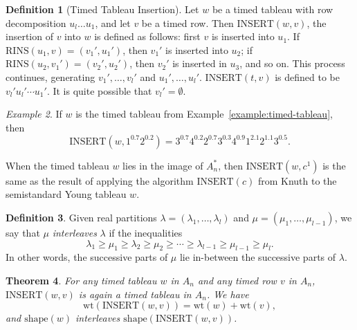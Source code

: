 \documentclass[10pt]{amsproc}
\newtheorem{theorem}{Theorem}[subsection]
\theoremstyle{definition}
\newtheorem{definition}[theorem]{Definition}
\theoremstyle{remark}
\newtheorem{example}[theorem]{Example}
\newcommand{\rowins}{\mathrm{RINS}}
\newcommand{\ins}{\mathrm{INSERT}}
\newcommand{\wt}{\mathrm{wt}}
\newcommand{\shape}{\mathrm{shape}}
\begin{document}
\begin{definition}
  [Timed Tableau Insertion]
  Let $w$ be a timed tableau with row decomposition $u_l\dotsc u_1$, and let $v$ be a timed row.
  Then $\ins(w, v)$, the insertion of $v$ into $w$ is defined as follows:
  first $v$ is inserted into $u_1$.
  If $\rowins(u_1,v)=(v_1',u_1')$, then $v_1'$ is inserted into $u_2$; if $\rowins(u_2,v_1')=(v_2',u_2')$, then $v_2'$ is inserted in $u_3$, and so on.
  This process continues, generating $v_1',\dotsc,v_l'$ and $u_1',\dotsc,u_l'$.
  $\ins(t,v)$ is defined to be $v_l'u_l'\dotsb u_1'$.
  It is quite possible that $v_l'=\emptyset$.
\end{definition}
\begin{example}
  If $w$ is the timed tableau from Example~\ref{example:timed-tableau}, then
  \begin{displaymath}
    \ins(w,1^{0.7}2^{0.2})=3^{0.7}4^{0.2}2^{0.7}3^{0.3}4^{0.9}1^{2.1}2^{1.1}3^{0.5}.
  \end{displaymath}
\end{example}
When the timed tableau $w$ lies in the image of $A_n^*$, then $\ins(w,c^1)$ is the same as the result of applying the algorithm $\text{INSERT}(c)$ from Knuth \cite{knuth} to the semistandard Young tableau $w$.
\begin{definition}
  Given real partitions $\lambda=(\lambda_1,\dotsc,\lambda_l)$ and $\mu=(\mu_1,\dotsc,\mu_{l-1})$, we say that $\mu$ \emph{interleaves} $\lambda$ if the inequalities
  \begin{displaymath}
    \lambda_1 \geq \mu_1 \geq \lambda_2 \geq \mu_2 \geq \dotsb \geq \lambda_{l-1}\geq \mu_{l-1}\geq \mu_l. 
  \end{displaymath}
  In other words, the successive parts of $\mu$ lie in-between the successive parts of $\lambda$.
\end{definition}
\begin{theorem}
  \label{theorem:tableauness-of-insertion}
  For any timed tableau $w$ in $A_n$ and any timed row $v$ in $A_n$, $\ins(w,v)$ is again a timed tableau in $A_n$.
  We have
  \begin{displaymath}
    \wt(\ins(w,v)) = \wt(w) + \wt(v),
  \end{displaymath}
  and $\shape(w)$ interleaves $\shape(\ins(w,v))$.
\end{theorem}
\end{document}
